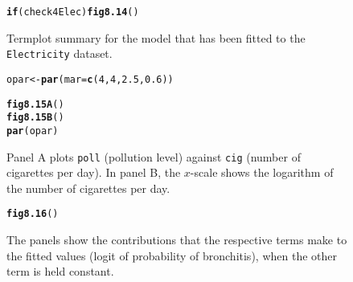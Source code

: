\documentclass[12pt, a4paper,  BCOR=8.25mm, DIV=15]{scrartcl}\usepackage[]{graphicx}\usepackage[]{color}
\makeatletter
\newcommand{\hlnum}[1]{\textcolor[rgb]{0.686,0.059,0.569}{#1}}%
\newcommand{\hlstd}[1]{\textcolor[rgb]{0.345,0.345,0.345}{#1}}%
\newcommand{\hlkwa}[1]{\textcolor[rgb]{0.161,0.373,0.58}{\textbf{#1}}}%
\newcommand{\hlkwb}[1]{\textcolor[rgb]{0.69,0.353,0.396}{#1}}%
\newcommand{\hlkwc}[1]{\textcolor[rgb]{0.333,0.667,0.333}{#1}}%
\newcommand{\hlkwd}[1]{\textcolor[rgb]{0.737,0.353,0.396}{\textbf{#1}}}%
\newenvironment{kframe}{%
 \def\at@end@of@kframe{}%
 \ifinner\ifhmode%
  \def\at@end@of@kframe{\end{minipage}}%
  \begin{minipage}{\columnwidth}%
 \fi\fi%
 \def\FrameCommand##1{\hskip\@totalleftmargin \hskip-\fboxsep
 \colorbox{shadecolor}{##1}\hskip-\fboxsep
     \hskip-\linewidth \hskip-\@totalleftmargin \hskip\columnwidth}%
 \MakeFramed {\advance\hsize-\width
   \@totalleftmargin\z@ \linewidth\hsize
   \@setminipage}}%
 {\par\unskip\endMakeFramed%
 \at@end@of@kframe}
\newenvironment{knitrout}{}{} %
\newcommand{\txtt}[1]{{\texttt{#1}}}
\makeatother
\begin{document}
\begin{figure}[H]
\begin{knitrout}
\color{fgcolor}\begin{kframe}
\begin{alltt}
\hlkwa{if}\hlstd{(check4Elec)}\hlkwd{fig8.14}\hlstd{()}
\end{alltt}
\end{kframe}
\end{knitrout}
\caption{Termplot summary for the model that has been fitted to the
  \texttt{Electricity} dataset.\label{fig:elec-log-tplot}}
\end{figure}



\begin{figure}[H]
\begin{knitrout}
\color{fgcolor}\begin{kframe}
\begin{alltt}
\hlstd{opar} \hlkwb{<-} \hlkwd{par}\hlstd{(}\hlkwc{mar}\hlstd{=}\hlkwd{c}\hlstd{(}\hlnum{4}\hlstd{,}\hlnum{4}\hlstd{,}\hlnum{2.5}\hlstd{,}\hlnum{0.6}\hlstd{))}

\hlkwd{fig8.15A}\hlstd{()}
\hlkwd{fig8.15B}\hlstd{()}
\hlkwd{par}\hlstd{(opar)}
\end{alltt}
\end{kframe}
\end{knitrout}
\caption{Panel A plots \txtt{poll} (pollution level) against
  \txtt{cig} (number of cigarettes per day).  In panel B, the
  $x$-scale shows the logarithm of the number of cigarettes per
  day.\label{fig:cig-poll}}
\end{figure}



\begin{figure}[H]
\begin{knitrout}
\color{fgcolor}\begin{kframe}
\begin{alltt}
\hlkwd{fig8.16}\hlstd{()}
\end{alltt}
\end{kframe}
\end{knitrout}
\caption{The panels show the contributions that the respective terms
  make to the fitted values (logit of probability of bronchitis), when
  the other term is held constant.\label{fig:xy-cig}}
\end{figure}
\end{document}
